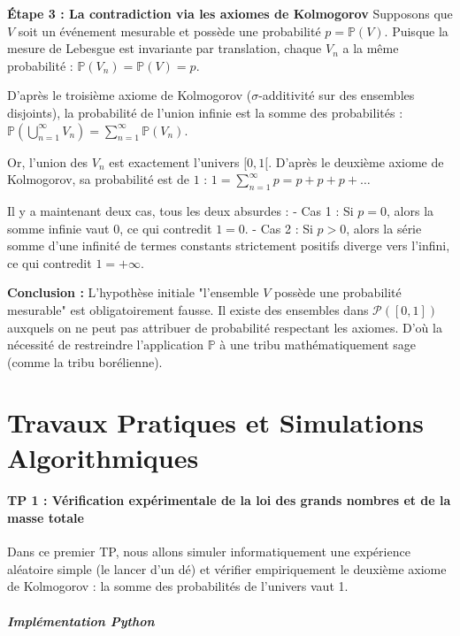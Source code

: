\documentclass[11pt,a4paper]{article}
\begin{document}
\textbf{Étape 3 : La contradiction via les axiomes de Kolmogorov}
Supposons que $V$ soit un événement mesurable et possède une probabilité $p = \mathbb{P}(V)$.
Puisque la mesure de Lebesgue est invariante par translation, chaque $V_n$ a la même probabilité : $\mathbb{P}(V_n) = \mathbb{P}(V) = p$.

D'après le troisième axiome de Kolmogorov ($\sigma$-additivité sur des ensembles disjoints), la probabilité de l'union infinie est la somme des probabilités :
$\mathbb{P}\left(\bigcup_{n=1}^\infty V_n\right) = \sum_{n=1}^\infty \mathbb{P}(V_n)$.

Or, l'union des $V_n$ est exactement l'univers $[0, 1[$. D'après le deuxième axiome de Kolmogorov, sa probabilité est de $1$ :
$1 = \sum_{n=1}^\infty p = p + p + p + \dots$

Il y a maintenant deux cas, tous les deux absurdes :
- Cas 1 : Si $p = 0$, alors la somme infinie vaut $0$, ce qui contredit $1 = 0$.
- Cas 2 : Si $p > 0$, alors la série somme d'une infinité de termes constants strictement positifs diverge vers l'infini, ce qui contredit $1 = +\infty$.

\textbf{Conclusion :}
L'hypothèse initiale "l'ensemble $V$ possède une probabilité mesurable" est obligatoirement fausse. Il existe des ensembles dans $\mathcal{P}([0, 1])$ auxquels on ne peut pas attribuer de probabilité respectant les axiomes. D'où la nécessité de restreindre l'application $\mathbb{P}$ à une tribu mathématiquement sage (comme la tribu borélienne).





\newpage
\part{Travaux Pratiques et Simulations Algorithmiques}
\subsection*{TP 1 : Vérification expérimentale de la loi des grands nombres et de la masse totale}

Dans ce premier TP, nous allons simuler informatiquement une expérience aléatoire simple (le lancer d'un dé) et vérifier empiriquement le deuxième axiome de Kolmogorov : la somme des probabilités de l'univers vaut 1.

\subsubsection*{Implémentation Python}
\end{document}
